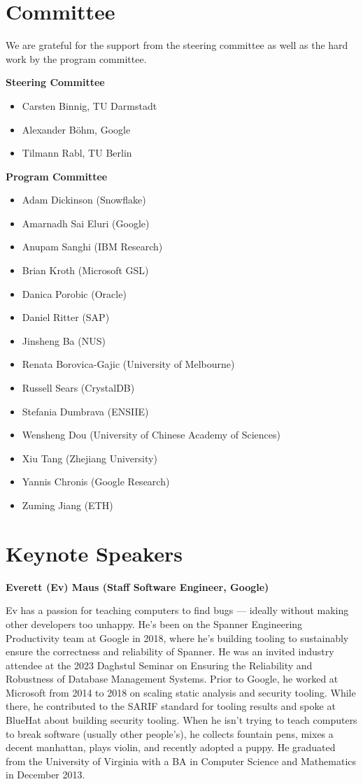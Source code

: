 \documentclass[sigconf]{acmart}
\begin{document}
\section{Committee}

We are grateful for the support from the steering committee as well as the hard work by the program committee.

\textbf{Steering Committee}
\begin{itemize}
	\item Carsten Binnig, TU Darmstadt
	\item Alexander Böhm, Google
	\item Tilmann Rabl, TU Berlin
\end{itemize}

\noindent{}\textbf{Program Committee}
\begin{itemize}
	\item Adam Dickinson (Snowflake)
	\item Amarnadh Sai Eluri (Google)
	\item Anupam Sanghi (IBM Research)
	\item Brian Kroth (Microsoft GSL)
	\item Danica Porobic (Oracle)
	\item Daniel Ritter (SAP)
	\item Jinsheng Ba (NUS)
	\item Renata Borovica-Gajic (University of Melbourne)
	\item Russell Sears (CrystalDB)
	\item Stefania Dumbrava (ENSIIE)
	\item Wensheng Dou (University of Chinese Academy of Sciences)
	\item Xiu Tang (Zhejiang University)
	\item Yannis Chronis (Google Research)
	\item Zuming Jiang (ETH)
\end{itemize}

\section{Keynote Speakers}
\textbf{Everett (Ev) Maus (Staff Software Engineer, Google)}

Ev has a passion for teaching computers to find bugs --- ideally without making other developers too unhappy.
He's been on the Spanner Engineering Productivity team at Google in 2018, where he’s building tooling to sustainably ensure the correctness and reliability of Spanner. He was an invited industry attendee at the 2023 Daghstul Seminar on Ensuring the Reliability and Robustness of Database Management Systems.
Prior to Google, he worked at Microsoft from 2014 to 2018 on scaling static analysis and security tooling. While there, he contributed to the SARIF standard for tooling results and spoke at BlueHat about building security tooling.
When he isn’t trying to teach computers to break software (usually other people’s), he collects fountain pens, mixes a decent manhattan, plays violin, and recently adopted a puppy.
He graduated from the University of Virginia with a BA in Computer Science and Mathematics in December 2013.
\end{document}
